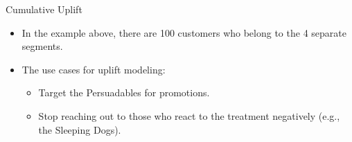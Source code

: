 \documentclass[20pt]{beamer}
\begin{document}
\begin{frame}{Cumulative Uplift}
  \begin{itemize}
  \item In the example above, there are 100 customers who belong to the 4 separate segments.

  \item The use cases for uplift modeling:
    \begin{itemize}
    \item Target the Persuadables for promotions.

    \item Stop reaching out to those who react to the treatment negatively (e.g., the Sleeping Dogs).
    \end{itemize}
  \end{itemize}

\end{frame}
\end{document}
